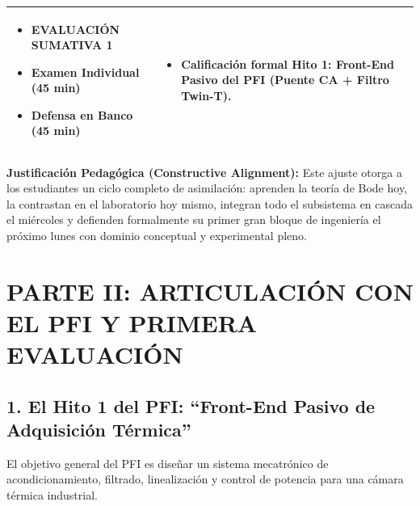 \documentclass[11pt,a4paper,twoside]{article}
\begin{document}
\begin{table}[ht!]
\begin{tabularx}{\textwidth}{|>{\raggedright\arraybackslash}p{3cm}|>{\raggedright\arraybackslash}X|>{\raggedright\arraybackslash}X|}
\begin{itemize}[leftmargin=*, nosep]
            \item \textbf{EVALUACIÓN SUMATIVA 1}
            \item Examen Individual (45 min)
            \item Defensa en Banco (45 min)
        \end{itemize} & 
        \begin{itemize}[leftmargin=*, nosep]
            \item Calificación formal Hito 1: Front-End Pasivo del PFI (Puente CA + Filtro Twin-T).
        \end{itemize} \\
        \hline
    \end{tabularx}
\end{table}

\begin{info}
\textbf{Justificación Pedagógica (Constructive Alignment):} Este ajuste otorga a los estudiantes un ciclo completo de asimilación: aprenden la teoría de Bode hoy, la contrastan en el laboratorio hoy mismo, integran todo el subsistema en cascada el miércoles y defienden formalmente su primer gran bloque de ingeniería el próximo lunes con dominio conceptual y experimental pleno.
\end{info}

\section{PARTE II: ARTICULACIÓN CON EL PFI Y PRIMERA EVALUACIÓN}

\subsection*{1. El Hito 1 del PFI: ``Front-End Pasivo de Adquisición Térmica''}
El objetivo general del PFI es diseñar un sistema mecatrónico de acondicionamiento, filtrado, linealización y control de potencia para una cámara térmica industrial.
\end{document}
